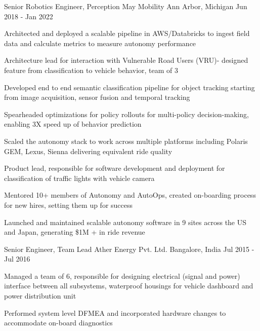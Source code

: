 \begin{cventries}
  \cventry
    {Senior Robotics Engineer, Perception} %
    {May Mobility} %
    {Ann Arbor, Michigan} %
    {Jun 2018 - Jan 2022} %
    {
      \begin{cvitems} %
        \item {Architected and deployed a scalable pipeline in AWS/Databricks to ingest field data and calculate metrics to measure autonomy performance}
        \item {Architecture lead for interaction with Vulnerable Road Users (VRU)- designed feature from classification to vehicle behavior, team of 3}
        \item {Developed end to end semantic classification pipeline for object tracking starting from image acquisition, sensor fusion and temporal tracking}
		\item {Spearheaded optimizations for policy rollouts for multi-policy decision-making, enabling 3X speed up of behavior prediction }
		\item {Scaled the autonomy stack to work across multiple platforms including Polaris GEM, Lexus, Sienna delivering equivalent ride quality}
        \item {Product lead, responsible for software development and deployment for classification of traffic lights with vehicle camera}
        \item {Mentored 10+ members of Autonomy and AutoOps, created on-boarding process for new hires, setting them up for success}
        \item {Launched and maintained scalable autonomy software in 9 sites across the US and Japan, generating \$1M + in ride revenue }
      \end{cvitems}
    }

  \cventry
    {Senior Engineer, Team Lead} %
    {Ather Energy Pvt. Ltd.} %
    {Bangalore, India} %
    {Jul 2015 - Jul 2016} %
    {
      \begin{cvitems} %
        \item{Managed a team of 6, responsible for designing electrical (signal and power) interface between all subsystems, waterproof housings for vehicle dashboard and power distribution unit}
        \item {Performed system level DFMEA and incorporated hardware changes to accommodate on-board diagnostics}
      \end{cvitems}
    }


\end{cventries}
